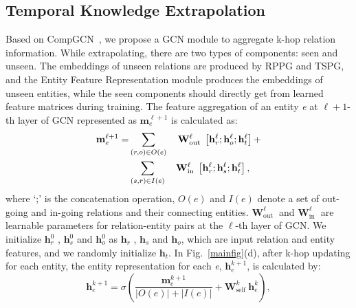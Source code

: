 \documentclass[sigconf]{acmart}
\begin{document}
\subsection{Temporal Knowledge Extrapolation} 
\par
Based on CompGCN~\citep{COMPGCN}, we propose a GCN module to aggregate k-hop relation information. While extrapolating, there are two types of components: seen and unseen. The embeddings of unseen relations are produced by RPPG and TSPG, and the Entity Feature Representation module produces the embeddings of unseen entities, while the seen components should directly get from learned feature matrices during training. The feature aggregation of an entity \emph{e} at $\ell+1$-th layer of GCN represented as $\mathbf{m}_{e}^{\ell+1}$ is calculated as:
\begin{equation}
\begin{aligned}
\setlength{\abovedisplayskip}{-8pt}
\setlength{\belowdisplayskip}{-10pt}
\begin{split}
\mathbf{m}_{e}^{\ell+1}=&\sum_{(r, o) \in  {O}(e)} \quad \mathbf{W}_{\text {out }}^{\ell}\left[\mathbf{h}_{r}^{\ell} ; \mathbf{h}_{o}^{\ell};\mathbf{h}_{t}^{\ell}\right]+\\
&\sum_{( s,r) \in  {I}(e)} \quad \mathbf{W}_{\text {in }}^{\ell}  \left[\mathbf{h}_{r}^{\ell} ; \mathbf{h}_{s}^{\ell};\mathbf{h}_{t}^{\ell}\right],
\end{split}
\end{aligned}
\end{equation}
where `;' is the concatenation operation, $ {O}(e)$ and $ {I}(e)$ denote a set of out-going and in-going relations and their  connecting entities. $\mathbf{W}_{\text {out }}^{\ell}$ and $\mathbf{W}_{\text {in }}^{\ell}$ are learnable parameters for relation-entity pairs at the $\ell$-th layer of GCN. We initialize $\mathbf{h}_{r}^{0}$ , $\mathbf{h}_{s}^{0}$ and $\mathbf{h}_{o}^{0}$ as $\mathbf{h}_{r}$ , $\mathbf{h}_{s}$ and $\mathbf{h}_{o}$, which are input relation and entity features, and we randomly initialize $\mathbf{h}_{t}$. In Fig.~\ref{mainfig}(d), after k-hop updating for each entity, the entity representation for each \emph{e}, $\mathbf{h}_{e}^{k+1}$, is calculated by:
\begin{equation}
\mathbf{h}_{e}^{k+1}=\sigma\left(\frac{\mathbf{m}_{e}^{k+1}}{| {O}(e)|+| {I}(e)|}+\mathbf{W}_{\text {self }}^{k} \mathbf{h}_{e}^{k}\right),
\end{equation}
\end{document}
